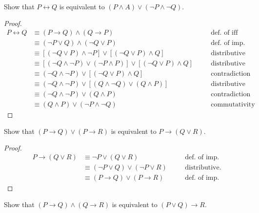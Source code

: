 \begin{tcolorbox}[title=Problem 6 (a), breakable]
Show that $P \leftrightarrow Q$ is equivalent to
$(P \wedge A) \vee (\neg P \wedge \neg Q)$.
\end{tcolorbox}

\begin{proof}
\begin{align*}
P \leftrightarrow Q &\equiv 
    (P \rightarrow Q) \wedge (Q \rightarrow P) && \quad \text{def. of iff} \\
&\equiv (\neg P \vee Q) \wedge (\neg Q \vee P) && \quad \text{def. of imp.} \\
&\equiv [(\neg Q \vee P) \wedge \neg P] \vee [(\neg Q \vee P) \wedge Q] && \quad \text{distributive} \\
&\equiv [(\neg Q \wedge \neg P) \vee (\neg P \wedge P)] \vee [(\neg Q \vee P) \wedge Q] && \quad \text{distributive} \\
&\equiv (\neg Q \wedge \neg P) \vee [(\neg Q \vee P) \wedge Q] && \quad \text{contradiction} \\
&\equiv (\neg Q \wedge \neg P) \vee [(Q \wedge \neg Q) \vee (Q \wedge P)] && \quad \text{distributive} \\
&\equiv (\neg Q \wedge \neg P) \vee (Q \wedge P) && \quad \text{contradiction} \\
&\equiv (Q \wedge P) \vee (\neg P \wedge \neg Q) && \quad \text{commutativity}
\end{align*}
\end{proof}

\begin{tcolorbox}[title=Problem 6 (b), breakable]
Show that $(P \rightarrow Q) \vee (P \rightarrow R)$ is equivalent to
$P \rightarrow (Q \vee R)$.
\end{tcolorbox}

\begin{proof}
\begin{align*}
P \rightarrow (Q \vee R) &\equiv \neg P \vee (Q \vee R) && \quad \text {def. of imp.} \\
&\equiv (\neg P \vee Q) \vee (\neg P \vee R) && \quad \text {distributive.} \\
&\equiv (P \rightarrow Q) \vee (P \rightarrow R) && \quad \text {def. of imp.}
\end{align*}
\end{proof}

\begin{tcolorbox}[title=Problem 7 (a), breakable]
Show that $(P \rightarrow Q) \wedge (Q \rightarrow R)$ is equivalent to 
$(P \vee Q) \rightarrow R$.
\end{tcolorbox}

